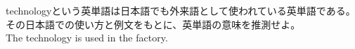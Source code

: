 \documentclass{jarticle}
\begin{document}
\vspace*{\fill}
\begin{center}
technologyという英単語は日本語でも外来語として使われている英単語である。\\
その日本語での使い方と例文をもとに、英単語の意味を推測せよ。\\
The technology is used in the factory.
\end{center}
\vspace*{\fill}
\end{document}
